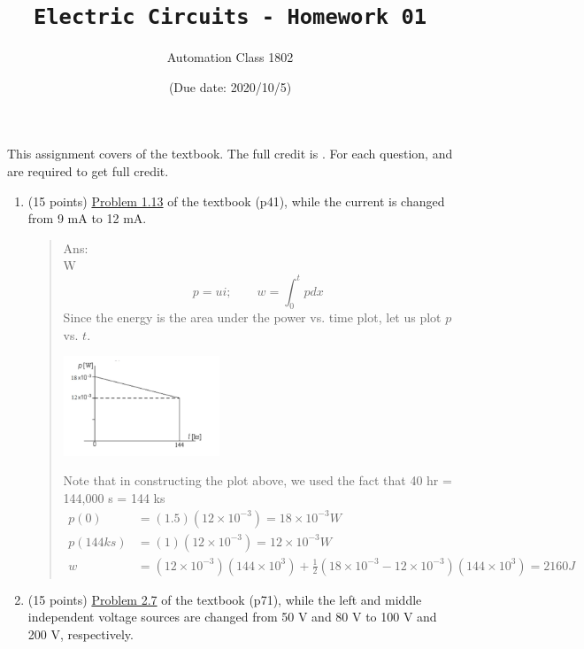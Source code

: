 \documentclass[12pt,a4paper]{article}
\title{\textbf{\texttt{Electric Circuits - Homework 01}}}
\author{Automation Class 1802}
\date{(Due date: 2020/10/5)}%
\begin{document}
\maketitle

{\large This assignment covers  of the textbook. The full credit is . For each question,  and  are required to get full credit.}

\begin{enumerate}%
    \item (15 points) \uline{Problem 1.13} of the textbook (p41), while the current is changed from 9 mA to 12 mA.
    \begin{quote}
        
        
        Ans:\\W
        \[p=ui;\qquad w=\int_{0}^{t}p dx \] %
        Since the energy is the area under the power vs. time plot, let us plot $p$ vs. $t$. 
        \vspace{-1em}
        \begin{center}
            \includegraphics[width=0.4\textwidth]{s1-1.png} 
        \end{center}
    Note that in constructing the plot above, we used the fact that 40 hr = 144,000 s = 144 ks
    \vspace{-1em}
        \begin{align*}%
        p(0) &=(1.5)(12 \times 10^{-3})=18 \times 10^{-3} W \\
        p(144 ks) &=(1)(12 \times 10^{-3})=12 \times 10^{-3} W \\
        w &=(12 \times 10^{-3})(144 \times 10^3)+\frac{1}{2}(18 \times 10^{-3} - 12 \times 10^{-3})(144 \times 10^3)=2160 J 
        \end{align*}
    \end{quote}
    
    \item (15 points) \uline{Problem 2.7} of the textbook (p71), while the left and middle independent voltage sources are changed from 50 V and 80 V to 100 V and 200 V, respectively.
    \begin{quote}
        

\end{quote}
\end{enumerate}
\end{document}
